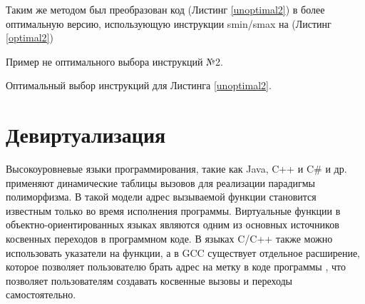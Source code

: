 Таким  же методом был преобразован код  (Листинг \ref{unoptimal2}) в более оптимальную версию, использующую инструкции smin/smax на (Листинг \ref{optimal2})
\begin{ListingEnv}[!h]
	\captiondelim{ } %
	\caption{Пример не оптимального выбора инструкций №2. }\label{unoptimal2}
\end{ListingEnv} 
\begin{ListingEnv}[!h]
	\captiondelim{ } %
	\caption{Оптимальный выбор инструкций для Листинга \ref{unoptimal2}. }\label{optimal2}
\end{ListingEnv} 



\section {Девиртуализация} \label{opt:devirt}
 Высокоуровневые языки программирования, такие как Java, C++ и C\# и др. применяют динамические таблицы вызовов для реализации парадигмы полиморфизма\cite{calder1994quantifying,suganuma2000overview,bauer2021novt}.  В такой модели адрес вызываемой функции становится известным только во время исполнения программы. Виртуальные функции в объектно-ориентированных языках являются одним из основных источников косвенных переходов в программном коде. В языках C/C++ также можно использовать указатели на функции, а в GCC  существует отдельное расширение, которое позволяет пользователю брать адрес на метку в коде программы \cite{shah1995function}, что  позволяет пользователям создавать косвенные вызовы и переходы самостоятельно. 
 
